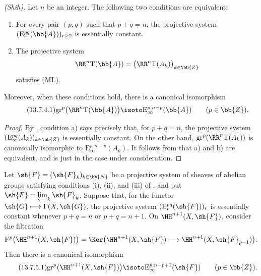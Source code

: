 \begin{proposition}[13.7.4]
\label{0.13.7.4}
\emph{(Shih).}
Let $n$ be an integer.
The following two conditions are equivalent:
\begin{enumerate}
  \item[{\rm a)}] For every pair $(p,q)$ such that $p+q=n$, the
  projective system
  $(\mathrm{E}_r^{pq}(\bb{A}))_{r\geq2}$ is essentially constant.
  \item[{\rm b)}] The projective system
  \[
    \RR^n\mathrm{T}(\bb{A})
    =
    \bigl(\RR^n\mathrm{T}(A_k)\bigr)_{k\in\bb{Z}}
  \]
  satisfies {\rm(ML)}.
\end{enumerate}
Moreover, when these conditions hold, there is a canonical
isomorphism
\begin{equation}
\label{0.13.7.4.1}
\tag{13.7.4.1}
  \mathrm{gr}^p\bigl(\RR^n\mathrm{T}(\bb{A})\bigr)
  \isoto
  \mathrm{E}_\infty^{p,n-p}(\bb{A})
  \qquad(p\in\bb{Z}).
\end{equation}
\end{proposition}

\begin{proof}
By , condition {\rm a)} says precisely that, for
$p+q=n$, the projective system
$(\mathrm{E}_\infty^{pq}(A_k))_{k\in\bb{Z}}$ is essentially
constant.
On the other hand,
$\mathrm{gr}^p(\RR^n\mathrm{T}(A_k))$ is canonically isomorphic to
$\mathrm{E}_\infty^{p,n-p}(A_k)$.
It follows from  that {\rm a)} and {\rm b)} are
equivalent, and  is just
 in the case under consideration.
\end{proof}

\begin{corollary}[13.7.5]
\label{0.13.7.5}
Let $\sh{F}=(\sh{F}_k)_{k\in\bb{N}}$ be a projective system of
sheaves of abelian groups satisfying conditions {\rm(i)}, {\rm(ii)},
and {\rm(iii)} of , and put
$\sh{F}=\varprojlim_k\sh{F}_k$.
Suppose that, for the functor
$\sh{G}\longmapsto\Gamma(X,\sh{G})$, the projective system
$(\mathrm{E}_r^{pq}(\sh{F}))_r$ is essentially constant whenever
$p+q=n$ or $p+q=n+1$.
On $\HH^{n+1}(X,\sh{F})$, consider the filtration
\[
  \mathrm{F}^p\bigl(\HH^{n+1}(X,\sh{F})\bigr)
  =
  \Ker\bigl(
    \HH^{n+1}(X,\sh{F})
    \longrightarrow
    \HH^{n+1}(X,\sh{F}_{p-1})
  \bigr).
\]
Then there is a canonical isomorphism
\begin{equation}
\label{0.13.7.5.1}
\tag{13.7.5.1}
  \mathrm{gr}^p\bigl(\HH^{n+1}(X,\sh{F})\bigr)
  \isoto
  \mathrm{E}_\infty^{p,n-p+1}(\sh{F})
  \qquad(p\in\bb{Z}).
\end{equation}
\end{corollary}

